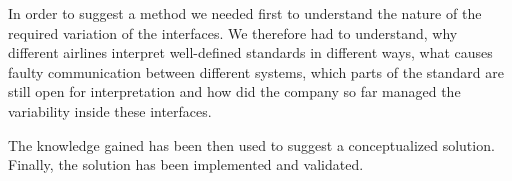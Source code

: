 In order to suggest a method we needed first to understand the nature of the required variation of the interfaces.
We therefore had to understand, why different airlines interpret well-defined standards in different ways, what causes faulty communication between different systems, which parts of the standard are still open for interpretation and how did the company so far managed the variability inside these interfaces. %


The knowledge gained %
has been then used to suggest a conceptualized solution.
Finally, the solution has been implemented and validated.






